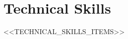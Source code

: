 \section*{Technical Skills}
\resumeSubHeadingListStart
\setlength{\itemsep}{-1pt}
<<TECHNICAL_SKILLS_ITEMS>>
\resumeSubHeadingListEnd
\vspace{-0.2cm}
